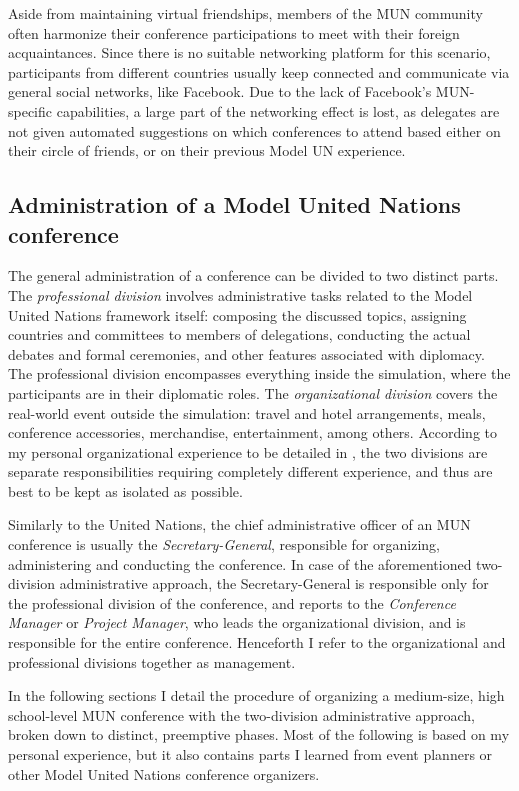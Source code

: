Aside from maintaining virtual friendships, members of the MUN community often harmonize their conference participations to meet with their foreign acquaintances. Since there is no suitable networking platform for this scenario, participants from different countries usually keep connected and communicate via general social networks, like Facebook. Due to the lack of Facebook's MUN-specific capabilities, a large part of the networking effect is lost, as delegates are not given automated suggestions on which conferences to attend based either on their circle of friends, or on their previous Model UN experience.

\subsection{Administration of a Model United Nations conference}

The general administration of a conference can be divided to two distinct parts. The \emph{professional division} involves administrative tasks related to the Model United Nations framework itself: composing the discussed topics, assigning countries and committees to members of delegations, conducting the actual debates and formal ceremonies, and other features associated with diplomacy. The professional division encompasses everything inside the simulation, where the participants are in their diplomatic roles. The \emph{organizational division} covers the real-world event outside the simulation: travel and hotel arrangements, meals, conference accessories, merchandise, entertainment, among others. According to my personal organizational experience to be detailed in , the two divisions are separate responsibilities requiring completely different experience, and thus are best to be kept as isolated as possible.

Similarly to the United Nations, the chief administrative officer of an MUN conference is usually the \emph{Secretary-General}, responsible for organizing, administering and conducting the conference. In case of the aforementioned two-division administrative approach, the Secretary-General is responsible only for the professional division of the conference, and reports to the \emph{Conference Manager} or \emph{Project Manager}, who leads the organizational division, and is responsible for the entire conference. Henceforth I refer to the organizational and professional divisions together as management.

In the following sections I detail the procedure of organizing a medium-size, high school-level MUN conference with the two-division administrative approach, broken down to distinct, preemptive phases. Most of the following is based on my personal experience, but it also contains parts I learned from event planners or other Model United Nations conference organizers.

